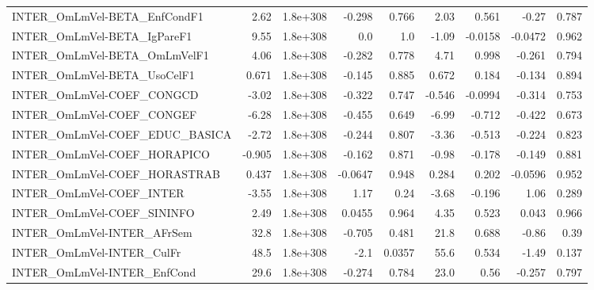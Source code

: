\begin{tabular}{lrrrrrrrr}
INTER\_OmLmVel-BETA\_EnfCondF1          &        2.62 &     1.8e+308 &   -0.298 &    0.766 &       2.03 &       0.561 &        -0.27 &         0.787 \\
INTER\_OmLmVel-BETA\_IgPareF1           &        9.55 &     1.8e+308 &      0.0 &      1.0 &      -1.09 &     -0.0158 &      -0.0472 &         0.962 \\
INTER\_OmLmVel-BETA\_OmLmVelF1          &        4.06 &     1.8e+308 &   -0.282 &    0.778 &       4.71 &       0.998 &       -0.261 &         0.794 \\
INTER\_OmLmVel-BETA\_UsoCelF1           &       0.671 &     1.8e+308 &   -0.145 &    0.885 &      0.672 &       0.184 &       -0.134 &         0.894 \\
INTER\_OmLmVel-COEF\_CONGCD             &       -3.02 &     1.8e+308 &   -0.322 &    0.747 &     -0.546 &     -0.0994 &       -0.314 &         0.753 \\
INTER\_OmLmVel-COEF\_CONGEF             &       -6.28 &     1.8e+308 &   -0.455 &    0.649 &      -6.99 &      -0.712 &       -0.422 &         0.673 \\
INTER\_OmLmVel-COEF\_EDUC\_BASICA        &       -2.72 &     1.8e+308 &   -0.244 &    0.807 &      -3.36 &      -0.513 &       -0.224 &         0.823 \\
INTER\_OmLmVel-COEF\_HORAPICO           &      -0.905 &     1.8e+308 &   -0.162 &    0.871 &      -0.98 &      -0.178 &       -0.149 &         0.881 \\
INTER\_OmLmVel-COEF\_HORASTRAB          &       0.437 &     1.8e+308 &  -0.0647 &    0.948 &      0.284 &       0.202 &      -0.0596 &         0.952 \\
INTER\_OmLmVel-COEF\_INTER              &       -3.55 &     1.8e+308 &     1.17 &     0.24 &      -3.68 &      -0.196 &         1.06 &         0.289 \\
INTER\_OmLmVel-COEF\_SININFO            &        2.49 &     1.8e+308 &   0.0455 &    0.964 &       4.35 &       0.523 &        0.043 &         0.966 \\
INTER\_OmLmVel-INTER\_AFrSem            &        32.8 &     1.8e+308 &   -0.705 &    0.481 &       21.8 &       0.688 &        -0.86 &          0.39 \\
INTER\_OmLmVel-INTER\_CulFr             &        48.5 &     1.8e+308 &     -2.1 &   0.0357 &       55.6 &       0.534 &        -1.49 &         0.137 \\
INTER\_OmLmVel-INTER\_EnfCond           &        29.6 &     1.8e+308 &   -0.274 &    0.784 &       23.0 &        0.56 &       -0.257 &         0.797 \\

\end{tabular}
